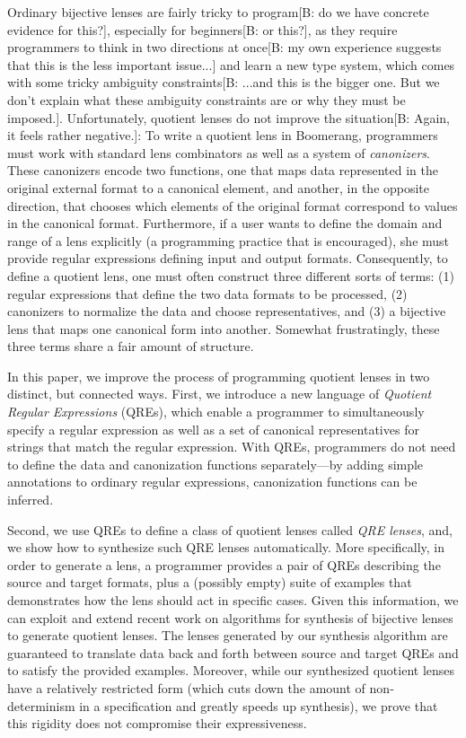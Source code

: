 \documentclass[acmsmall,review,anonymous]{acmart}
\newcommand{\FINISH}[3]{\ifdraft\textcolor{#1}{[#2: #3]}\fi}
\newcommand{\bcp}[1]{\FINISH{dkred}{B}{#1}}
\begin{document}
Ordinary bijective lenses are fairly tricky to program\bcp{do we have
  concrete evidence for this?}, especially for
beginners\bcp{or this?}, as they require programmers to think in two
directions at once\bcp{my own experience suggests that this is the less
  important issue...}
and learn a new type system, which comes with some tricky ambiguity
constraints\bcp{...and this is the bigger one.  But we don't explain what
  these ambiguity constraints are or why they must be imposed.}.
Unfortunately, quotient lenses do not improve the situation\bcp{Again, it
  feels rather negative.}:  To
write a quotient lens in Boomerang, programmers must work with standard lens
combinators as well as a system of \emph{canonizers}.
These canonizers encode two functions, one that
maps data represented in the original external format
to a canonical element, and another, in the opposite direction, that chooses
which elements of the original format correspond to values in the canonical
format. Furthermore, if a user wants to define the domain and range of
a lens explicitly (a programming practice that is encouraged), she must
provide regular expressions defining input and output formats.
Consequently, to define a quotient lens, one must often
construct three different sorts
of terms: (1) regular expressions that define the two data formats
to be processed, (2) canonizers to normalize the data
and choose representatives, and (3) a bijective lens that maps
one canonical form into another.  Somewhat frustratingly,
these three terms share a fair amount of structure.

In this paper, we improve the process of programming quotient lenses
in two distinct, but connected ways. First, we
introduce a new language of {\em Quotient Regular Expressions} (QREs), which
enable a programmer to simultaneously specify a regular expression as well as
a set of canonical representatives for strings that match the regular
expression. With
QREs, programmers do not need to define the data and canonization functions
separately---by adding simple annotations to ordinary regular expressions,
canonization functions can be inferred.

Second, we use QREs to define a class of quotient lenses called {\em QRE
lenses}, and, we show how to synthesize such QRE
lenses automatically.
More specifically, in
order to generate a lens, a programmer provides a pair of QREs
describing the source and target formats, plus 
a (possibly empty) suite of examples that demonstrates how the
lens should act in specific cases.  Given this information,
we can exploit and extend recent work on algorithms for synthesis of
bijective lenses~\cite{optician} to generate quotient lenses.
The lenses generated by
our synthesis algorithm are guaranteed to translate data back and forth
between source and target QREs and to satisfy the provided examples.
Moreover, while our synthesized quotient lenses have a relatively
restricted form (which cuts down the amount of non-determinism in
a specification and greatly speeds up synthesis), we prove that
this rigidity does not compromise their expressiveness.
\end{document}
